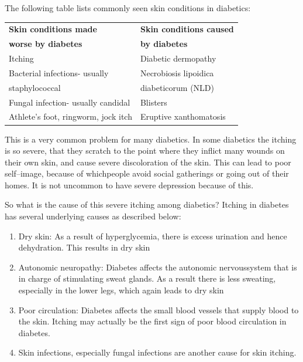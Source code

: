 \vskip 4pt
\noindent The following table lists commonly seen skin conditions in diabetics:

\begin{center}
\begin{tabular}{|l|l|}
\hline
\textbf{Skin conditions made} & \textbf{Skin conditions caused}\\
\textbf{worse by diabetes} & \textbf{by diabetes}\\
\hline
Itching & Diabetic dermopathy\\
\hline
Bacterial infections- usually & Necrobiosis lipoidica\\
\hline
staphylococcal & diabeticorum (NLD)\\
\hline
Fungal infection- usually candidal & Blisters\\
\hline
Athlete’s foot, ringworm, jock itch & Eruptive xanthomatosis\\
\hline
\end{tabular}
\end{center}


This is a very common problem for many diabetics. In some dia\-betics the itching is so severe, that they scratch to the point where they inflict many wounds on their own skin, and cause severe dis\-coloration of the skin. This can lead to poor self–image, because of which\break people avoid social gatherings or going out of their homes. It is not un\-common to have severe depression because of this.

So what is the cause of this severe itching among diabetics? Itching in diabetes has several underlying causes as described below:
\begin{enumerate}[•]
\itemsep=0pt
\item Dry skin: As a result of hyperglycemia, there is excess urination and hence dehydration. This results in dry skin
\item Autonomic neuropathy: Diabetes affects the autonomic nervous\break system that is in charge of stimulating sweat glands. As a result there is less sweating, especially in the lower legs, which again leads to dry skin
\item Poor circulation: Diabetes affects the small blood vessels that supply blood to the skin. Itching may actually be the first sign of poor blood circulation in diabetes.
\item Skin infections, especially fungal infections are another cause for skin itching.
\end{enumerate}

